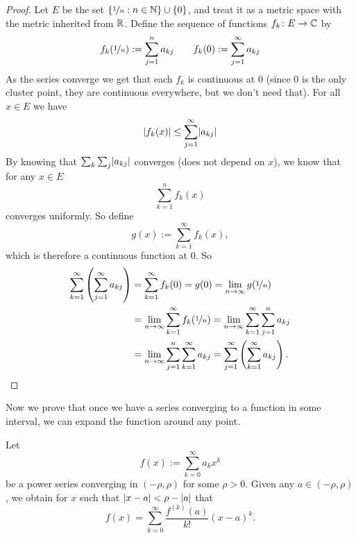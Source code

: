 \begin{proof}
Let $E$ be the set $\{ \nicefrac{1}{n} : n \in {\mathbb{N}} \} \cup \{ 0 \}$,
and treat it as a metric space with the metric inherited from ${\mathbb{R}}$.
Define the sequence of functions $f_k \colon E \to {\mathbb{C}}$
by
\begin{equation*}
f_k(\nicefrac{1}{n}) := \sum_{j=1}^n a_{kj}
\qquad
f_k(0) := \sum_{j=1}^\infty a_{kj}
\end{equation*}
As the series converge we get that each $f_k$ is continuous at $0$
(since 0 is the only cluster point, they are continuous everywhere, but
we don't need that).
For all $x \in E$ we have
\begin{equation*}
\lvert {f_k(x)} \rvert \leq \sum_{j=1}^\infty \lvert {a_{kj}} \rvert
\end{equation*}
By knowing that $\sum_k \sum_j \lvert {a_{kj}} \rvert$ converges (does not depend on
$x$), we know that for any $x \in E$
\begin{equation*}
\sum_{k=1}^n f_k(x)
\end{equation*}
converges uniformly.  So define
\begin{equation*}
g(x) := \sum_{k=1}^\infty f_k(x) ,
\end{equation*}
which is therefore a continuous function at $0$.
So
\begin{equation*}
\begin{split}
\sum_{k=1}^\infty \left( \sum_{j=1}^\infty a_{kj} \right)
& =
\sum_{k=1}^\infty f_k(0)
= g(0)
= \lim_{n\to\infty} g(\nicefrac{1}{n}) \\
&= 
\lim_{n\to\infty}\sum_{k=1}^\infty f_k(\nicefrac{1}{n})
= 
\lim_{n\to\infty}\sum_{k=1}^\infty \sum_{j=1}^n a_{kj} \\
&= 
\lim_{n\to\infty}\sum_{j=1}^n \sum_{k=1}^\infty a_{kj}
= 
\sum_{j=1}^\infty \left( \sum_{k=1}^\infty a_{kj} \right) . \qedhere
\end{split}
\end{equation*}
\end{proof}

Now we prove that once we have a series converging to a function
in some interval, we can expand the function around any point.

\begin{thm}
\label{thm:tayloranal}
Let
\begin{equation*}
f(x) := \sum_{k=0}^\infty a_k x^k
\end{equation*}
be a power series converging in $(-\rho,\rho)$ for some $\rho > 0$.  Given any $a \in
(-\rho,\rho)$, we obtain
for $x$ such that $\lvert {x-a} \rvert < \rho-\lvert {a} \rvert$ that
\begin{equation*}
f(x) =
\sum_{k=0}^\infty \frac{f^{(k)}(a)}{k!} {(x-a)}^{k} .
\end{equation*}
\end{thm}


